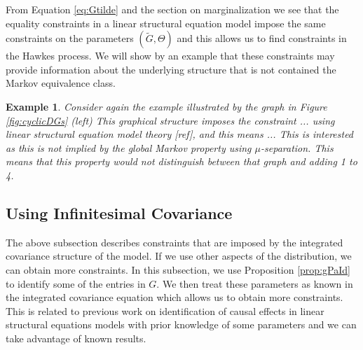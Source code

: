 \documentclass[accepted]{uai2021} %
\newtheorem{exmp}[thm]{Example}
\begin{document}
From Equation \ref{eq:Gtilde} and the section on marginalization we see that 
the equality 
constraints in a linear structural equation model impose the same constraints 
on the parameters $(\tilde{G}, \Theta)$ and this allows us to find constraints 
in the Hawkes process. We will show by an example that these constraints may 
provide information about the underlying structure that is not contained the 
Markov equivalence class.




\begin{exmp}
	Consider again the example illustrated by the graph in Figure 
	\ref{fig:cyclicDGs} (left)
	This graphical structure imposes the constraint ... using linear structural 
	equation model theory [ref], and this means ... This is interested as this 
	is not implied by the global Markov property using $\mu$-separation. This 
	means that this property would not distinguish between that graph and 
	adding 1 to 4. 
\end{exmp}


\subsection{Using Infinitesimal Covariance}

The above subsection describes constraints that are imposed by the integrated 
covariance structure of the model. If we use other aspects of the distribution, 
we can obtain more constraints. In this subsection, we use Proposition 
\ref{prop:gPaId} to identify some of the entries in $G$. We then treat these 
parameters as known in the integrated covariance equation which allows us to 
obtain more constraints. This is related to previous work on identification of 
causal effects in linear structural equations models with prior knowledge of 
some parameters and we can take advantage of known results.
\end{document}
